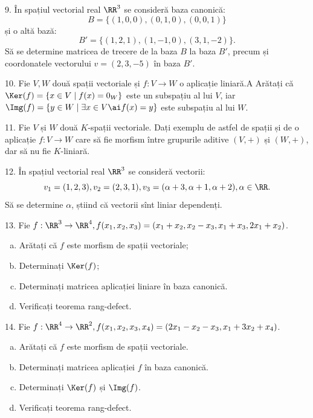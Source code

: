\vspace{1cm}

9. În spațiul vectorial real $\RR^3$ se consideră baza canonică:
\[
  B = \{ (1, 0, 0), (0, 1, 0), (0, 0, 1) \}
\]
și o altă bază:
\[
  B' = \{(1, 2, 1), (1, -1, 0), (3, 1, -2) \}.
\]
Să se determine matricea de trecere de la baza $B$ la baza $B'$, precum și
coordonatele vectorului $v = (2, 3, -5)$ în baza $B'$.

\vspace{1cm}

10. Fie $V, W$ două spații vectoriale și $f : V \to W$ o aplicație liniară.A
Arătați că $\Ker(f) = \{x \in V \mid f(x) = 0_W\}$ este un subspațiu al lui
$V$, iar $\Img(f) = \{ y \in W \mid \exists x \in V \ai f(x) = y \}$ este
subspațiu al lui $W$.

\vspace{1cm}

11. Fie $V$ și $W$ două $K$-spații vectoriale. Dați exemplu de astfel de
spații și de o aplicație $f : V \to W$ care să fie morfism între grupurile
aditive $(V, +)$ și $(W, +)$, dar să nu fie $K$-liniară.

\vspace{1cm}

12. În spațiul vectorial real $\RR^3$ se consideră vectorii:
\[
  v_1 = (1, 2, 3), v_2 = (2, 3, 1), v_3 = (\alpha + 3, \alpha + 1, \alpha + 2), %
  \alpha \in \RR.
\]
Să se determine $\alpha$, știind că vectorii sînt liniar dependenți.

\vspace{1cm}

13. Fie $f : \RR^3 \to \RR^4, f(x_1, x_2, x_3) = (x_1 + x_2, x_2 - x_3, x_1 + x_3, 2x_1 + x_2)$.
\begin{enumerate}[(a)]
\item Arătați că $f$ este morfism de spații vectoriale;
\item Determinați $\Ker(f)$;
\item Determinați matricea aplicației liniare în baza canonică.
\item Verificați teorema rang-defect.
\end{enumerate}

\vspace{1cm}

14. Fie $f : \RR^4 \to \RR^2, f(x_1, x_2, x_3, x_4) = (2x_1 - x_2 - x_3, x_1 + 3x_2 + x_4)$.
\begin{enumerate}[(a)]
\item Arătați că $f$ este morfism de spații vectoriale.
\item Determinați matricea aplicației $f$ în baza canonică.
\item Determinați $\Ker(f)$ și $\Img(f)$.
\item Verificați teorema rang-defect.
\end{enumerate}

